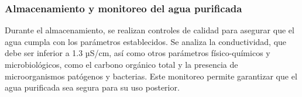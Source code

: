 \subsubsection{Almacenamiento y monitoreo del agua purificada}

Durante el almacenamiento, se realizan controles de calidad para asegurar que el agua cumpla con los parámetros establecidos. Se analiza la conductividad,
que debe ser inferior a 1.3 µS/cm, así como otros parámetros físico-químicos y microbiológicos, como el carbono orgánico total y la presencia de
microorganismos patógenos y bacterias. Este monitoreo permite garantizar que el agua purificada sea segura para su uso posterior.